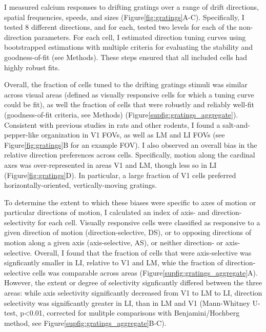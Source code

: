 I measured calcium responses to drifting gratings over a range of drift directions, spatial frequencies, speeds, and sizes (Figure\ref{fig:gratings}A-C). Specifically, I tested 8 different directions, and for each, tested two levels for each of the non-direction parameters. For each cell, I estimated direction tuning curves using bootstrapped estimations with multiple criteria for evaluating the stability and goodness-of-fit (see Methods)\cite{Liang2018}. These steps ensured that all included cells had highly robust fits. 

Overall, the fraction of cells tuned to the drifting gratings stimuli was similar across visual areas (defined as visually responsive cells for which a tuning curve could be fit), as well the fraction of cells that were robustly and reliably well-fit (goodness-of-fit criteria, see Methods) (Figure\ref{supfig:gratings_aggregate}). Consistent with previous studies in rats and other rodents, I found a salt-and-pepper-like organization in V1 FOVs, as well as LM and LI FOVs (see Figure\ref{fig:gratings}B for an example FOV). I also observed an overall bias in the relative direction preferences across cells. Specifically, motion along the cardinal axes was over-represented in areas V1 and LM, though less so in LI (Figure\ref{fig:gratings}D). In particular, a large fraction of V1 cells preferred horizontally-oriented, vertically-moving gratings.  

To determine the extent to which these biases were specific to axes of motion or particular directions of motion, I calculated an index of axis- and direction-selectivity for each cell. Visually responsive cells were classified as responsive to a given direction of motion (direction-selective, DS), or to opposing directions of motion along a given axis (axis-selective, AS), or neither direction- or axis-selective. Overall, I found that the fraction of cells that were axis-selective was signficantly smaller in LI, relative to V1 and LM, whie the fraction of direction-selective cells was comparable across areas (Figure\ref{supfig:gratings_aggregate}A). However, the extent or degree of selectivity signficantly differed between the three areas: while axis selectivity significantly decreased from V1 to LM to LI, direction selectivity was significantly greater in LI, than in LM and V1 (Mann-Whitney U-test, p<0.01, corrected for mulitple comparisons with Benjamini/Hochberg method, see Figure\ref{supfig:gratings_aggregate}B-C).

